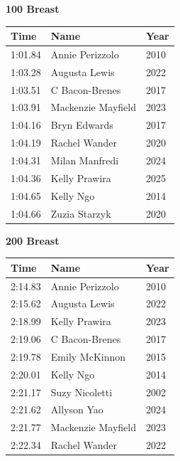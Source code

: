 \vspace{1.2em}
\noindent\begin{minipage}[t]{0.48\textwidth}
\centering
\textbf{\textcolor{teamprimary}{100 Breast}}\par
\vspace{0.5em}
\centering
\small
\renewcommand{\arraystretch}{1.0}
\setlength{\tabcolsep}{4pt}
\begin{tabular}{@{}p{1.8cm}p{3.0cm}p{1.0cm}@{}}
\toprule
\textbf{Time} & \textbf{Name} & \textbf{Year} \\
\midrule
1:01.84 & Annie Perizzolo & 2010 \\
1:03.28 & Augusta Lewis & 2022 \\
1:03.51 & C Bacon-Brenes & 2017 \\
1:03.91 & Mackenzie Mayfield & 2023 \\
1:04.16 & Bryn Edwards & 2017 \\
1:04.19 & Rachel Wander & 2020 \\
1:04.31 & Milan Manfredi & 2024 \\
1:04.36 & Kelly Prawira & 2025 \\
1:04.65 & Kelly Ngo & 2014 \\
1:04.66 & Zuzia Starzyk & 2020 \\
\bottomrule
\end{tabular}
\end{minipage}
\hfill
\begin{minipage}[t]{0.48\textwidth}
\centering
\textbf{\textcolor{teamprimary}{200 Breast}}\par
\vspace{0.5em}
\centering
\small
\renewcommand{\arraystretch}{1.0}
\setlength{\tabcolsep}{4pt}
\begin{tabular}{@{}p{1.8cm}p{3.0cm}p{1.0cm}@{}}
\toprule
\textbf{Time} & \textbf{Name} & \textbf{Year} \\
\midrule
2:14.83 & Annie Perizzolo & 2010 \\
2:15.62 & Augusta Lewis & 2022 \\
2:18.99 & Kelly Prawira & 2023 \\
2:19.06 & C Bacon-Brenes & 2017 \\
2:19.78 & Emily McKinnon & 2015 \\
2:20.01 & Kelly Ngo & 2014 \\
2:21.17 & Suzy Nicoletti & 2002 \\
2:21.62 & Allyson Yao & 2024 \\
2:21.77 & Mackenzie Mayfield & 2023 \\
2:22.34 & Rachel Wander & 2022 \\
\bottomrule
\end{tabular}
\end{minipage}
